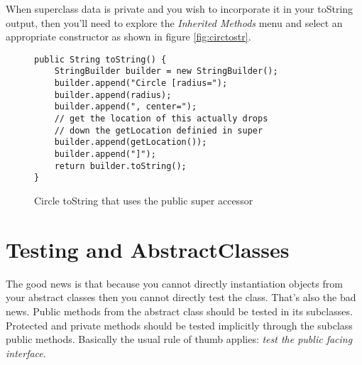 \documentclass[]{tufte-handout}
\begin{document}
When superclass data is private and you wish to incorporate it in your toString output, then  you'll need to explore the \textit{Inherited Methods} menu and select an appropriate constructor as shown in figure \ref{fig:circtostr}.

\begin{figure}[!ht]
\begin{lstlisting}
public String toString() {
	StringBuilder builder = new StringBuilder();
	builder.append("Circle [radius=");
	builder.append(radius);
	builder.append(", center=");
	// get the location of this actually drops
	// down the getLocation definied in super
	builder.append(getLocation());
	builder.append("]");
	return builder.toString();
}

\end{lstlisting}
\label{fig:circeq}
\caption{Circle toString that uses the public super accessor}
\end{figure}

\section{Testing and AbstractClasses}

The good news is that because you cannot directly instantiation objects from your abstract classes then you cannot directly test the class. That's also the bad news. Public methods from the abstract class should be tested in its subclasses. Protected and private methods should be tested implicitly through the subclass public methods. Basically the usual rule of thumb applies: \textit{test the public facing interface}. 
\end{document}
